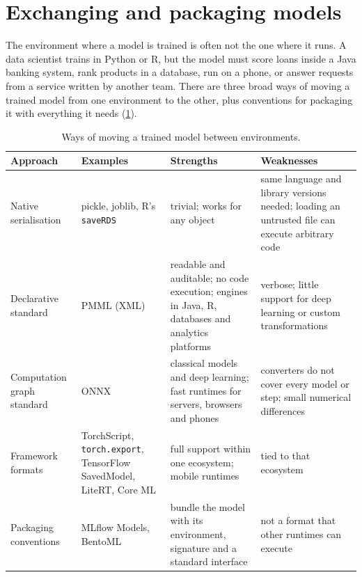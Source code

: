 \section{Exchanging and packaging models}\label{sec:exchange}

The environment where a model is trained is often not the one where it runs. A data scientist
trains in Python or R, but the model must score loans inside a Java banking system, rank products in a
database, run on a phone, or answer requests from a service written by another team. There are three
broad ways of moving a trained model from one environment to the other, plus conventions for packaging
it with everything it needs (\cref{tab:formats}).

\begin{table}[htbp]
\centering\small
\caption{Ways of moving a trained model between environments.}\label{tab:formats}
\begin{tabularx}{\textwidth}{@{}>{\raggedright\arraybackslash}p{2.35cm}>{\raggedright\arraybackslash}p{2.6cm}>{\raggedright\arraybackslash}X>{\raggedright\arraybackslash}X@{}}
\toprule
Approach & Examples & Strengths & Weaknesses\\
\midrule
Native serialisation & pickle, joblib, R's \texttt{saveRDS} & trivial; works for any object & same
language and library versions needed; loading an untrusted file can execute arbitrary code\\
Declarative standard & PMML (XML) & readable and auditable; no code execution; engines in Java, R,
databases and analytics platforms & verbose; little support for deep learning or custom
transformations\\
Computation graph standard & ONNX & classical models and deep learning; fast runtimes for servers,
browsers and phones & converters do not cover every model or step; small numerical differences\\
Framework formats & TorchScript, \texttt{torch.export}, TensorFlow SavedModel, LiteRT, Core ML & full
support within one ecosystem; mobile runtimes & tied to that ecosystem\\
Packaging conventions & MLflow Models, BentoML & bundle the model with its environment, signature and a
standard interface & not a format that other runtimes can execute\\
\bottomrule
\end{tabularx}
\end{table}


